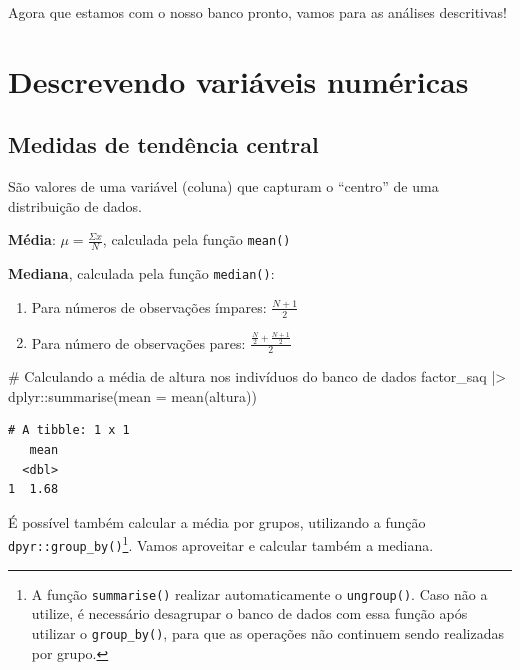 \documentclass[
  letterpaper,
  DIV=11,
  numbers=noendperiod]{scrartcl}
\newenvironment{Shaded}{\begin{snugshade}}{\end{snugshade}}
\newcommand{\AttributeTok}[1]{\textcolor[rgb]{0.40,0.45,0.13}{#1}}
\newcommand{\CommentTok}[1]{\textcolor[rgb]{0.37,0.37,0.37}{#1}}
\newcommand{\FunctionTok}[1]{\textcolor[rgb]{0.28,0.35,0.67}{#1}}
\newcommand{\NormalTok}[1]{\textcolor[rgb]{0.00,0.23,0.31}{#1}}
\newcommand{\SpecialCharTok}[1]{\textcolor[rgb]{0.37,0.37,0.37}{#1}}
\begin{document}
Agora que estamos com o nosso banco pronto, vamos para as análises
descritivas!

\hypertarget{descrevendo-variuxe1veis-numuxe9ricas}{%
\section{Descrevendo variáveis
numéricas}\label{descrevendo-variuxe1veis-numuxe9ricas}}

\hypertarget{medidas-de-tenduxeancia-central}{%
\subsection{Medidas de tendência
central}\label{medidas-de-tenduxeancia-central}}

São valores de uma variável (coluna) que capturam o ``centro'' de uma
distribuição de dados.

\textbf{Média}: \(\mu = \frac{\Sigma x}{N}\), calculada pela função
\texttt{mean()}

\textbf{Mediana}, calculada pela função \texttt{median()}:

\begin{enumerate}
\def\labelenumi{\arabic{enumi}.}
\item
  Para números de observações ímpares: \(\frac{N + 1}2\)
\item
  Para número de observações pares:
  \(\frac{\frac{N}{2} + \frac{N + 1}{2}}{2}\)
\end{enumerate}

\begin{Shaded}
\begin{Highlighting}[]
\CommentTok{\# Calculando a média de altura nos indivíduos do banco de dados}
\NormalTok{factor\_saq }\SpecialCharTok{|\textgreater{}} 
\NormalTok{  dplyr}\SpecialCharTok{::}\FunctionTok{summarise}\NormalTok{(}\AttributeTok{mean =} \FunctionTok{mean}\NormalTok{(altura))}
\end{Highlighting}
\end{Shaded}

\begin{verbatim}
# A tibble: 1 x 1
   mean
  <dbl>
1  1.68
\end{verbatim}

É possível também calcular a média por grupos, utilizando a função
\texttt{dpyr::group\_by()}\footnote{A função \texttt{summarise()}
  realizar automaticamente o \texttt{ungroup()}. Caso não a utilize, é
  necessário desagrupar o banco de dados com essa função após utilizar o
  \texttt{group\_by()}, para que as operações não continuem sendo
  realizadas por grupo.}. Vamos aproveitar e calcular também a mediana.
\end{document}
